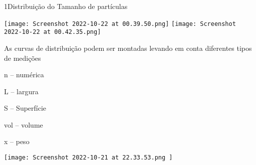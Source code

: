 \documentclass[\mainfilename]{subfiles}
\begin{document}
\begin{sectionBox}1{Distribuição do Tamanho de partículas} %
    
    \begin{multicols}{2}\centering
        \texttt{[image: Screenshot 2022-10-22 at 00.39.50.png]}
        \texttt{[image: Screenshot 2022-10-22 at 00.42.35.png]}
    \end{multicols}

    As curvas de distribuição podem ser montadas levando em conta diferentes tipos de medições
    \begin{itemize}
        \begin{multicols}{3}
           \item[n --] numérica
           \item[L --] largura
           \item[S --] Superfície
           \item[vol --] volume
           \item[x --] peso
        \end{multicols}
    \end{itemize}

    \begin{center}
        \texttt{[image: 
            Screenshot 2022-10-21 at 22.33.53.png
        ]}
    \end{center}

\end{sectionBox}
\end{document}

